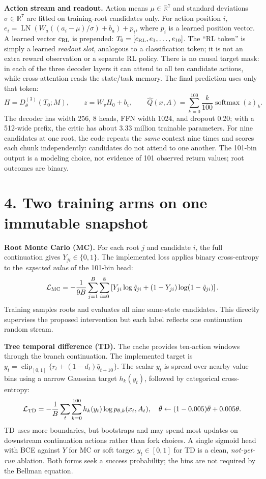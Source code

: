 \documentclass[10pt,letterpaper]{article}
\begin{document}
\textbf{Action stream and readout.} Action means $\mu\in\mathbb R^7$ and standard deviations $\sigma\in\mathbb R^7$ are fitted on training-root candidates only. For action position $i$, $e_i=\operatorname{LN}(W_a((a_i-\mu)/\sigma)+b_a)+p_i$, where $p_i$ is a learned position vector. A learned vector $c_{\rm RL}$ is prepended: $T_0=[c_{\rm RL},e_1,\ldots,e_{10}]$. The ``RL token'' is simply a learned \emph{readout slot}, analogous to a classification token; it is not an extra reward observation or a separate RL policy. There is no causal target mask: in each of the three decoder layers it can attend to all ten candidate actions, while cross-attention reads the state/task memory. The final prediction uses only that token:
\begin{equation}
H=D_\theta^{(3)}(T_0;M),\qquad z=W_vH_0+b_v,\qquad
\hat Q(x,A)=\sum_{k=0}^{100}\frac{k}{100}\operatorname{softmax}(z)_k.
\end{equation}
The decoder has width 256, 8 heads, FFN width 1024, and dropout 0.20; with a 512-wide prefix, the critic has about 3.33 million trainable parameters. For nine candidates at one root, the code repeats the \emph{same} context nine times and scores each chunk independently: candidates do not attend to one another. The 101-bin output is a modeling choice, not evidence of 101 observed return values; root outcomes are binary.

\newpage
\section*{4. Two training arms on one immutable snapshot}
\textbf{Root Monte Carlo (MC).} For each root $j$ and candidate $i$, the full continuation gives $Y_{ji}\in\{0,1\}$. The implemented loss applies binary cross-entropy to the \emph{expected value} of the 101-bin head:
\begin{equation}
\mathcal L_{\rm MC}=-\frac{1}{9B}\sum_{j=1}^{B}\sum_{i=0}^{8}\left[Y_{ji}\log\hat q_{ji}+(1-Y_{ji})\log(1-\hat q_{ji})\right].
\end{equation}
Training samples roots and evaluates all nine same-state candidates. This directly supervises the proposed intervention but each label reflects one continuation random stream.

\textbf{Tree temporal difference (TD).} The cache provides ten-action windows through the branch continuation. The implemented target is $y_t=\operatorname{clip}_{[0,1]}\{r_t+(1-d_t)\bar q_{t+10}\}$. The scalar $y_t$ is spread over nearby value bins using a narrow Gaussian target $h_k(y_t)$, followed by categorical cross-entropy:
\begin{equation}
\mathcal L_{\rm TD}=-\frac1B\sum_t\sum_{k=0}^{100}h_k(y_t)\log p_{\theta,k}(x_t,A_t),\quad
\bar\theta\leftarrow(1-0.005)\bar\theta+0.005\theta.
\end{equation}
TD uses more boundaries, but bootstraps and may spend most updates on downstream continuation actions rather than fork choices. A single sigmoid head with BCE against $Y$ for MC or soft target $y_t\in[0,1]$ for TD is a clean, \emph{not-yet-run} ablation. Both forms seek a success probability; the bins are not required by the Bellman equation.
\end{document}
